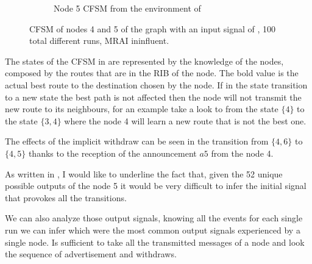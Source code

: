 \begin{figure}[h]
\begin{subfigure}[b]{0.45\textwidth}
		 \caption{Node \num{5} \ac{CFSM} from the environment of }
         \label{fig:fsm_node5}
     \end{subfigure}
		\caption{\ac{CFSM} of nodes \num{4} and \num{5} of the graph
			 with an input signal of ,
			\num{100} total different runs, \ac{MRAI} ininfluent.
			}
        \label{fig:fsm_griffin_fig4}
\end{figure}

The states of the \ac{CFSM} in  are represented by the
knowledge of the nodes, composed by the routes that are in the \ac{RIB} of the node.
The bold value is the actual best route to the destination chosen by the node.
If in the state transition to a new state the best path is not affected then the
node will not transmit the new route to its neighbours, for an example take
a look to  from the state $\{4\}$ to the state $\{3, 4\}$
where the node \num{4} will learn a new route that is not the best one.

The effects of the implicit withdraw can be seen in 
the transition from $\{4, 6\}$ to $\{4, 5\}$ thanks to the reception of the
announcement $a5$ from the node \num{4}.

As written in \cite{griffinFSM}, I would like to underline the fact that, given
the \num{52} unique possible outputs of the node \num{5} it would be very difficult
to infer the initial signal that provokes all the transitions.

We can also analyze those output signals, knowing all the events for each single
run we can infer which were the most common output signals experienced by a single node.
Is sufficient to take all the transmitted messages of a node and look the sequence
of advertisement and withdraws.

